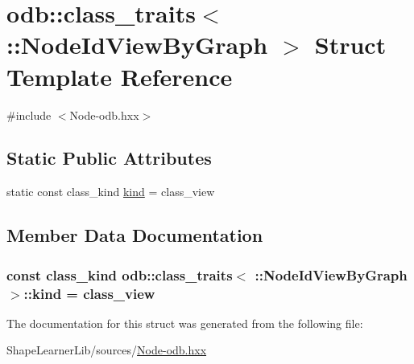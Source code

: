 \hypertarget{structodb_1_1class__traits_3_01_1_1_node_id_view_by_graph_01_4}{}\section{odb\+:\+:class\+\_\+traits$<$ \+:\+:Node\+Id\+View\+By\+Graph $>$ Struct Template Reference}
\label{structodb_1_1class__traits_3_01_1_1_node_id_view_by_graph_01_4}


{\ttfamily \#include $<$Node-\/odb.\+hxx$>$}

\subsection*{Static Public Attributes}
\begin{DoxyCompactItemize}
\item 
static const class\+\_\+kind \hyperlink{structodb_1_1class__traits_3_01_1_1_node_id_view_by_graph_01_4_a2630c5e106f271ebefe00117a65d0219}{kind} = class\+\_\+view
\end{DoxyCompactItemize}


\subsection{Member Data Documentation}
\hypertarget{structodb_1_1class__traits_3_01_1_1_node_id_view_by_graph_01_4_a2630c5e106f271ebefe00117a65d0219}{}
\subsubsection[{kind}]{\setlength{\rightskip}{0pt plus 5cm}const class\+\_\+kind odb\+::class\+\_\+traits$<$ \+::{\bf Node\+Id\+View\+By\+Graph} $>$\+::kind = class\+\_\+view\hspace{0.3cm}{\ttfamily [static]}}\label{structodb_1_1class__traits_3_01_1_1_node_id_view_by_graph_01_4_a2630c5e106f271ebefe00117a65d0219}


The documentation for this struct was generated from the following file\+:\begin{DoxyCompactItemize}
\item 
Shape\+Learner\+Lib/sources/\hyperlink{_node-odb_8hxx}{Node-\/odb.\+hxx}\end{DoxyCompactItemize}
